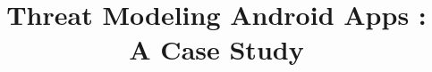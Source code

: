 \documentclass[conference, pdftex]{IEEEtran}
\begin{document}
	
	\title{Threat Modeling Android Apps : A Case Study}
	
	\maketitle
	
	
	
	
	
	
	
	
	
%	
	
	
	

	
	
	
	{\footnotesize 
		
		
	}
	
\end{document}
